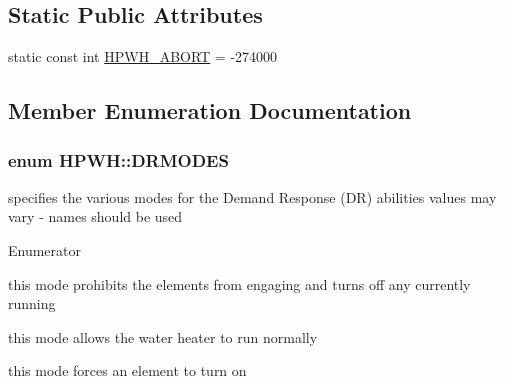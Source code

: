 \subsection*{Static Public Attributes}
\begin{DoxyCompactItemize}
\item 
static const int \hyperlink{class_h_p_w_h_a727a9e272cf7ac3564ebd67bfb8ed063}{H\-P\-W\-H\-\_\-\-A\-B\-O\-R\-T} = -\/274000
\end{DoxyCompactItemize}


\subsection{Member Enumeration Documentation}
\hypertarget{class_h_p_w_h_a6a74814715ed6a33a75fd0d9dc3e7107}{
\subsubsection[{D\-R\-M\-O\-D\-E\-S}]{\setlength{\rightskip}{0pt plus 5cm}enum {\bf H\-P\-W\-H\-::\-D\-R\-M\-O\-D\-E\-S}}}\label{class_h_p_w_h_a6a74814715ed6a33a75fd0d9dc3e7107}
specifies the various modes for the Demand Response (D\-R) abilities values may vary -\/ names should be used \begin{Desc}
\item[Enumerator]\par
\begin{description}
\item[{\em 
\hypertarget{class_h_p_w_h_a6a74814715ed6a33a75fd0d9dc3e7107acb6ede5bfedbd26d1e1021c1dfeaaea8}{D\-R\-\_\-\-B\-L\-O\-C\-K}\label{class_h_p_w_h_a6a74814715ed6a33a75fd0d9dc3e7107acb6ede5bfedbd26d1e1021c1dfeaaea8}
}]this mode prohibits the elements from engaging and turns off any currently running \item[{\em 
\hypertarget{class_h_p_w_h_a6a74814715ed6a33a75fd0d9dc3e7107a3ad0a53f7db054449c523c96107a820a}{D\-R\-\_\-\-A\-L\-L\-O\-W}\label{class_h_p_w_h_a6a74814715ed6a33a75fd0d9dc3e7107a3ad0a53f7db054449c523c96107a820a}
}]this mode allows the water heater to run normally \item[{\em 
\hypertarget{class_h_p_w_h_a6a74814715ed6a33a75fd0d9dc3e7107ac7a7e433da8920f98289ecd6b3246a6a}{D\-R\-\_\-\-E\-N\-G\-A\-G\-E}\label{class_h_p_w_h_a6a74814715ed6a33a75fd0d9dc3e7107ac7a7e433da8920f98289ecd6b3246a6a}
}]this mode forces an element to turn on \end{description}
\end{Desc}
